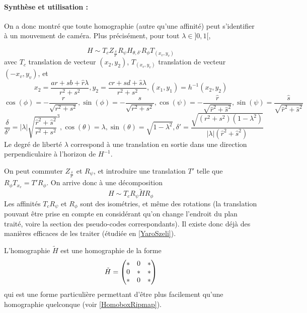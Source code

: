  \paragraph{Synthèse et utilisation :}
  On a donc montré que toute homographie (autre qu'une affinité) peut s'identifier à un mouvement de caméra. Plus précisément, pour tout $\lambda \in ]0,1[$,

  \begin{equation*}
H \sim T_{c} Z_{\frac{\delta}{\delta'}}  R_{\psi}  H_{\theta,\delta'} R_{\phi}  T_{(x_v,y_v)}
  \end{equation*}
  avec $T_c$ translation de vecteur $(x_2,y_2)$, $T_{(x_v,y_v)}$ translation de vecteur $(-x_v,y_v)$, et
 \begin{equation*}
x_2=\frac{ar+sb+\hat r \lambda}{r^2 +s^2}, y_2=\frac{cr+sd+\hat s \lambda}{r^2 +s^2}, (x_1 , y_1) = h^{-1}(x_{2},y_{2})
  \end{equation*}
 \begin{equation*}
 \cos( \phi )= - \frac{r}{\sqrt{r^2 + s^2}}, \sin( \phi )= - \frac{s}{\sqrt{r^2 + s^2}},\cos( \psi ) =- \frac{\hat r}{\sqrt{\hat r^2 + \hat s^2}}, \sin( \psi ) = \frac{\hat s}{\sqrt{\hat r^2 + \hat s^2}}
 \end{equation*}
 \begin{equation*}
 \frac{\delta}{\delta'}=|\lambda|\sqrt{\frac{\hat r^2 + \hat s^2}{r^2 + s^2}}^{3}, \cos(\theta)=\lambda, \sin(\theta)=\sqrt{1-\lambda^2}, \delta'=  \frac{\sqrt{(r^2 + s^2)(1-\lambda^2)}}{|\lambda| (\hat r^2+\hat s^2)}
 \end{equation*}
 Le degré de liberté $\lambda$ correspond à une translation en sortie dans une direction perpendiculaire à l'horizon de $H^{-1}$.
 
 On peut commuter $Z_{\frac{\delta}{\delta'}}$ et $R_{\psi}$, et introduire une translation $T'$ telle que $R_{\phi}  T_{x_{v}} = T' R_\phi$. On arrive donc à une décomposition
   \begin{equation}
H \sim T_{c} R_{\psi}  \tilde H R_{\phi}
 \label{formule_decomposition_effective}
  \end{equation}
  Les affinités $T_{c} R_{\psi}$ et $R_{\phi}$ sont des isométries, et même des rotations (la translation pouvant être prise en compte en considérant qu'on change l'endroit du plan traité, voire la section des pseudo-codes correspondants). Il existe donc déjà des manières efficaces de les traiter (étudiée en \ref{YaroSzeli}).
  
  L'homographie $\tilde H$ est une homographie de la forme
  \[\tilde H = \begin{pmatrix} *&0&*\\ 0&*&*\\ *&0&* \end{pmatrix}\]
  qui est une forme particulière permettant d'être plus facilement qu'une homographie quelconque (voir \ref{HomoboxRipmap}).
  
